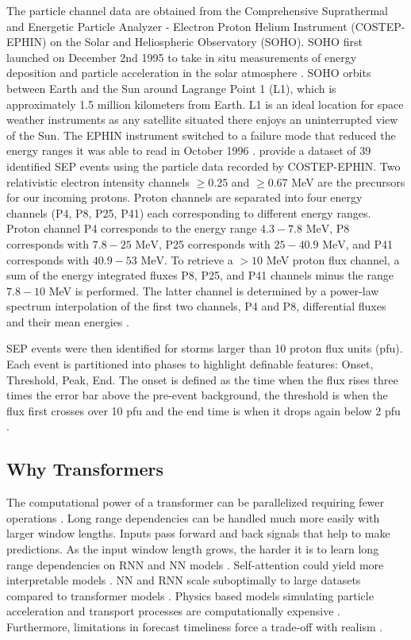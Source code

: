 The particle channel data are obtained from the Comprehensive Suprathermal and Energetic Particle Analyzer - Electron Proton Helium Instrument (COSTEP-EPHIN)  on the Solar and Heliospheric Observatory (SOHO). SOHO first launched on December 2nd 1995 to take in situ measurements of energy deposition and particle acceleration in the solar atmosphere \cite{SOHOCOSTEPEPHINCDFPT1M}.
SOHO orbits between Earth and the Sun around Lagrange Point 1 (L1), which is approximately 1.5 million kilometers from Earth. L1 is an ideal location 
for space weather instruments as any satellite situated there enjoys an uninterrupted view of the Sun.
The EPHIN instrument switched to a failure mode that reduced the energy ranges it was able to read in October 1996 \cite{kuhl2019revising}.
 provide a dataset of 39 identified SEP events using the particle data recorded by COSTEP-EPHIN. Two relativistic electron intensity channels $\geq$0.25 and $\geq$0.67 MeV \cite{mullermellin1995costep} are the precursors for our incoming protons. Proton channels are separated into four energy channels (P4, P8, P25, P41) each corresponding to  different energy ranges.
Proton channel P4 corresponds to the energy range $4.3 - 7.8 \text{ MeV}$, P8 corresponds with $7.8-25 \text{ MeV}$,  P25 corresponds with  $25 - 40.9 \text{ MeV}$, and P41 corresponds with $40.9 - 53 \text{ MeV}$. To retrieve a $>10$ MeV proton flux channel, a sum of the energy integrated fluxes P8, P25, and P41 channels minus the range
$7.8-10$ MeV is performed. The latter channel is determined by a power-law spectrum interpolation of the first two channels, P4 and P8, differential fluxes and their mean energies \cite{torres2025machine}.

SEP events were then identified for storms larger than 10 proton flux units (pfu). Each event is partitioned into phases to highlight definable features: Onset, Threshold, Peak, End.
The onset is defined as the time when the flux rises three times the error bar above the pre-event background, the threshold is when the flux first crosses over 10 pfu and the end time is when it drops again below 2 pfu \cite{torres2025machine}.

\subsection{Why Transformers}
The computational power of a transformer can be parallelized requiring fewer operations \cite{vaswani2017attention}. Long range dependencies can be handled much more easily
with larger window lengths. Inputs pass forward and back signals that help to make predictions.
As the input window length grows, the harder it is to learn long range dependencies on RNN and NN models \cite{zhao2026transformersurvey}. Self-attention could yield more interpretable models \cite{vaswani2017attention}.
NN and RNN scale suboptimally to large datasets compared to transformer models \cite{zhao2026transformersurvey}.
Physics based models simulating particle acceleration and transport processes are computationally expensive \cite{Camporeale2019,yu2026,kasapis2026review}.
Furthermore, limitations in forecast timeliness force a trade-off with realism \cite{yu2026}.

